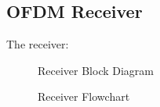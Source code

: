 \subsection{OFDM Receiver}
The receiver:
\begin{figure}[htpb!]
	\centerline{\resizebox{15cm}{!}{}}
	\caption{Receiver Block Diagram}
	\label{fig:ofdm_r_meth}
\end{figure}
\begin{figure}[htpb!]
	\centerline{}
	\caption{Receiver Flowchart}
	\label{fig:ofdm_receiver_meth}
\end{figure}


\pagebreak

